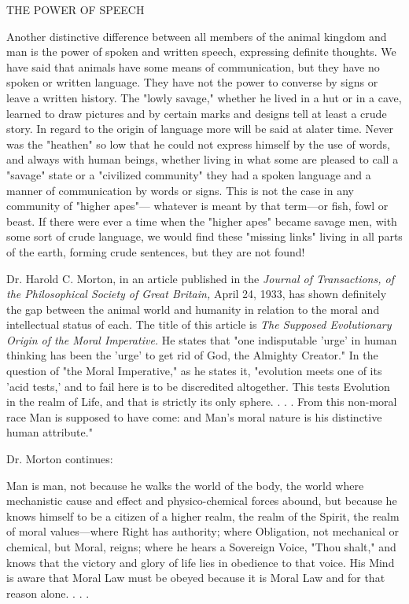 THE POWER OF SPEECH

Another distinctive difference between all members of the animal kingdom and man is the
power of spoken and written speech, expressing definite thoughts. We have said that animals
have some means of communication, but they have no spoken or written language. They
have not the power to converse by signs or leave a written history. The "lowly savage,"
whether he lived in a hut or in a cave, learned to draw pictures and by certain marks and
designs tell at least a crude story. In regard to the origin of language more will be said at alater time. Never was the "heathen" so low that he could not express himself by the use of
words, and always with human beings, whether living in what some are pleased to call a
"savage" state or a "civilized community" they had a spoken language and a manner of
communication by words or signs. This is not the case in any community of "higher apes"—
whatever is meant by that term—or fish, fowl or beast. If there were ever a time when the
"higher apes" became savage men, with some sort of crude language, we would find these
"missing links" living in all parts of the earth, forming crude sentences, but they are not
found!

Dr. Harold C. Morton, in an article published in the \textit{Journal of Transactions, of the
Philosophical Society of Great Britain,} April 24, 1933, has shown definitely the gap between
the animal world and humanity in relation to the moral and intellectual status of each. The
title of this article is \textit{The Supposed Evolutionary Origin of the Moral Imperative.} He states
that "one indisputable 'urge' in human thinking has been the 'urge' to get rid of God, the
Almighty Creator." In the question of "the Moral Imperative," as he states it, "evolution
meets one of its 'acid tests,' and to fail here is to be discredited altogether. This tests
Evolution in the realm of Life, and that is strictly its only sphere. . . . From this non-moral
race Man is supposed to have come: and Man's moral nature is his distinctive human
attribute."

Dr. Morton continues:

Man is man, not because he walks the world of the body, the world where mechanistic cause
and effect and physico-chemical forces abound, but because he knows himself to be a citizen
of a higher realm, the realm of the Spirit, the realm of moral values—where Right has
authority; where Obligation, not mechanical or chemical, but Moral, reigns; where he hears a
Sovereign Voice, "Thou shalt," and knows that the victory and glory of life lies in obedience
to that voice. His Mind is aware that Moral Law must be obeyed because it is Moral Law and
for that reason alone. . . .

